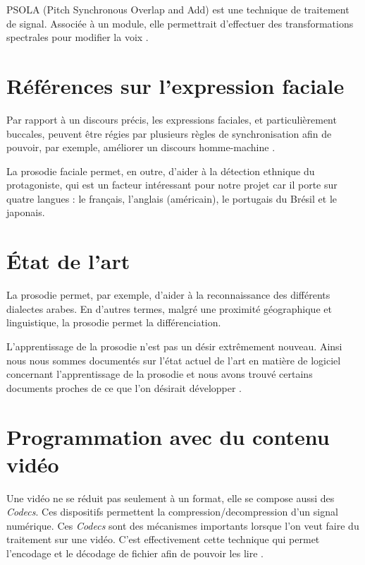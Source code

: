 PSOLA (Pitch Synchronous Overlap and Add) est une technique de traitement de signal. Associée à un module, elle permettrait d'effectuer des transformations spectrales pour modifier la voix \cite{valbret1992voice}.

\section{Références sur l'expression faciale}\label{ref_transfo_faciales}

Par rapport à un discours précis, les expressions faciales, et particulièrement buccales, peuvent être régies par plusieurs règles de synchronisation afin de pouvoir, par exemple, améliorer un discours homme-machine \cite{beskow1995rule} .

La prosodie faciale permet, en outre, d'aider à la détection ethnique du protagoniste, qui est un facteur intéressant pour notre projet car il porte sur quatre langues : le français, l'anglais (américain), le portugais du Brésil et le japonais\cite{matsumoto1992american}.


\section{État de l'art}\label{state_of_the_art}

La prosodie permet, par exemple, d'aider à la reconnaissance des différents dialectes arabes. En d'autres termes, malgré une proximité géographique et linguistique, la prosodie permet la différenciation\cite{rouas2006identification}.

L'apprentissage de la prosodie n'est pas un désir extrêmement nouveau. Ainsi nous nous sommes documentés sur l'état actuel de l'art en matière de logiciel concernant l'apprentissage de la prosodie et nous avons trouvé certains documents proches de ce que l'on désirait développer \cite{10.4000/alsic.332}. 

\section{Programmation avec du contenu vidéo}

Une vidéo ne se réduit pas seulement à un format, elle se compose aussi des \textit{Codecs}. Ces dispositifs permettent la compression/decompression d'un signal numérique. Ces \textit{Codecs} sont des mécanismes importants lorsque l'on veut faire du traitement sur une vidéo. C'est effectivement cette technique qui permet l'encodage et le décodage de fichier afin de pouvoir les lire \cite{ghanbari1999video} \cite{he2013introduction}.

